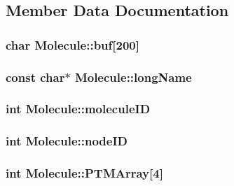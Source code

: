 \subsection{Member Data Documentation}
\hypertarget{classMolecule_a5b6f24dea7138830541e938e2eed707a}{
\subsubsection[{buf}]{\setlength{\rightskip}{0pt plus 5cm}char {\bf Molecule::buf}\mbox{[}200\mbox{]}}}
\label{classMolecule_a5b6f24dea7138830541e938e2eed707a}
\hypertarget{classMolecule_a4ac09eefeba07dcb455014acc1ad00c9}{
\subsubsection[{longName}]{\setlength{\rightskip}{0pt plus 5cm}const char$\ast$ {\bf Molecule::longName}}}
\label{classMolecule_a4ac09eefeba07dcb455014acc1ad00c9}
\hypertarget{classMolecule_a563a9a295191833b51660f77749e3628}{
\subsubsection[{moleculeID}]{\setlength{\rightskip}{0pt plus 5cm}int {\bf Molecule::moleculeID}}}
\label{classMolecule_a563a9a295191833b51660f77749e3628}
\hypertarget{classMolecule_a4eafa2831869e116f64c86987f1cac81}{
\subsubsection[{nodeID}]{\setlength{\rightskip}{0pt plus 5cm}int {\bf Molecule::nodeID}}}
\label{classMolecule_a4eafa2831869e116f64c86987f1cac81}
\hypertarget{classMolecule_ae6aff39305dd77531ea5a213b6f2b1c5}{
\subsubsection[{PTMArray}]{\setlength{\rightskip}{0pt plus 5cm}int {\bf Molecule::PTMArray}\mbox{[}4\mbox{]}}}
